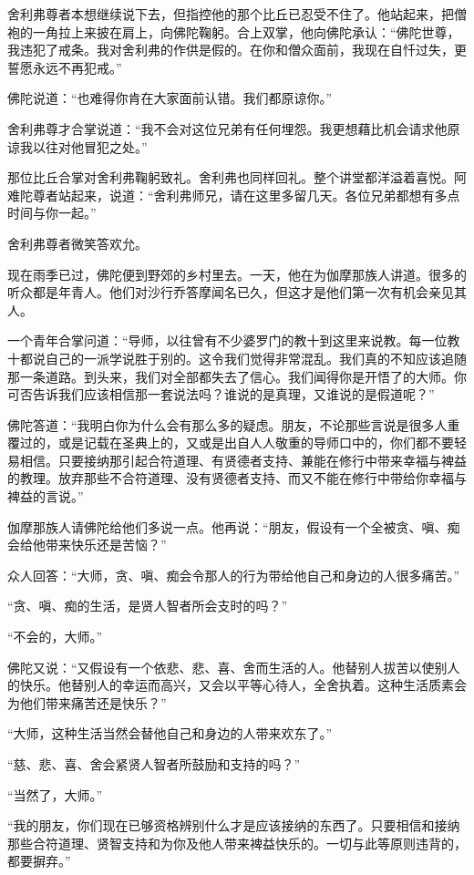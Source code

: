 \documentclass[12pt,twoside,openany]{book}
\begin{document}
舍利弗尊者本想继续说下去，但指控他的那个比丘已忍受不住了。他站起来，把僧袍的一角拉上来披在肩上，向佛陀鞠躬。合上双掌，他向佛陀承认：“佛陀世尊，我违犯了戒条。我对舍利弗的作供是假的。在你和僧众面前，我现在自忏过失，更誓愿永远不再犯戒。”

佛陀说道：“也难得你肯在大家面前认错。我们都原谅你。”

舍利弗尊才合掌说道：“我不会对这位兄弟有任何埋怨。我更想藉比机会请求他原谅我以往对他冒犯之处。”

那位比丘合掌对舍利弗鞠躬致礼。舍利弗也同样回礼。整个讲堂都洋溢着喜悦。阿难陀尊者站起来，说道：“舍利弗师兄，请在这里多留几天。各位兄弟都想有多点时间与你一起。”

舍利弗尊者微笑答欢允。

现在雨季已过，佛陀便到野郊的乡村里去。一天，他在为伽摩那族人讲道。很多的听众都是年青人。他们对沙行乔答摩闻名已久，但这才是他们第一次有机会亲见其人。

一个青年合掌问道：“导师，以往曾有不少婆罗门的教十到这里来说教。每一位教十都说自己的一派学说胜于别的。这令我们觉得非常混乱。我们真的不知应该追随那一条道路。到头来，我们对全部都失去了信心。我们闻得你是开悟了的大师。你可否告诉我们应该相信那一套说法吗？谁说的是真理，又谁说的是假道呢？”

佛陀答道：“我明白你为什么会有那么多的疑虑。朋友，不论那些言说是很多人重覆过的，或是记载在圣典上的，又或是出自人人敬重的导师口中的，你们都不要轻易相信。只要接纳那引起合符道理、有贤德者支持、兼能在修行中带来幸福与裨益的教理。放弃那些不合符道理、没有贤德者支持、而又不能在修行中带给你幸福与裨益的言说。”

伽摩那族人请佛陀给他们多说一点。他再说：“朋友，假设有一个全被贪、嗔、痴会给他带来快乐还是苦恼？”

众人回答：“大师，贪、嗔、痴会令那人的行为带给他自己和身边的人很多痛苦。”

“贪、嗔、痴的生活，是贤人智者所会支时的吗？”

“不会的，大师。”

佛陀又说：“又假设有一个依悲、悲、喜、舍而生活的人。他替别人拔苦以使别人的快乐。他替别人的幸运而高兴，又会以平等心待人，全舍执着。这种生活质素会为他们带来痛苦还是快乐？”

“大师，这种生活当然会替他自己和身边的人带来欢东了。”

“慈、悲、喜、舍会紧贤人智者所鼓励和支持的吗？”

“当然了，大师。”

“我的朋友，你们现在已够资格辨别什么才是应该接纳的东西了。只要相信和接纳那些合符道理、贤智支持和为你及他人带来裨益快乐的。一切与此等原则违背的，都要摒弃。”
\end{document}
